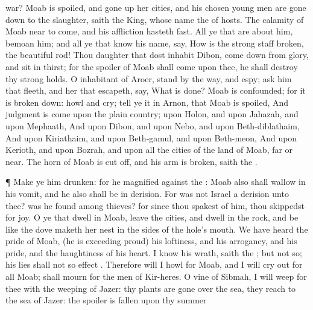{war?
Moab is
spoiled, and gone
up
{} her
cities, and his
chosen young
men are gone
down to the
slaughter,
saith the
King, whose
name
{} the
{} of
hosts.
The
calamity of
Moab
{}
near to
come, and his
affliction
hasteth
fast.
All ye that are
about him,
bemoan him; and all ye that
know his
name,
say, How is the
strong
staff
broken,
{} the
beautiful
rod!
Thou
daughter that dost
inhabit
Dibon, come
down from
{}
glory, and
sit in
thirst; for the
spoiler of
Moab shall
come upon thee,
{} he shall
destroy thy strong
holds.
O
inhabitant of
Aroer,
stand by the
way, and
espy;
ask him that
fleeth, and her that
escapeth,
{}
say, What is
done?
Moab is
confounded; for it is broken
down:
howl and
cry;
tell ye it in
Arnon, that
Moab is
spoiled,
And
judgment is
come upon the
plain
country; upon
Holon, and upon
Jahazah, and upon
Mephaath,
And upon
Dibon, and upon
Nebo, and upon
Beth-diblathaim,
And upon
Kiriathaim, and upon
Beth-gamul, and upon
Beth-meon,
And upon
Kerioth, and upon
Bozrah, and upon all the
cities of the
land of
Moab,
far or
near.
The
horn of
Moab is cut
off, and his
arm is
broken,
saith the
{}.
\par }{\PP {}¶ Make ye him
drunken: for he
magnified
{} against the
{}:
Moab also shall
wallow in his
vomit, and he also shall be in
derision.
For was not
Israel a
derision unto thee? was he
found among
thieves? for
since thou
spakest of him, thou
skippedst for joy.
O ye that
dwell in
Moab,
leave the
cities, and
dwell in the
rock, and be like the
dove
{} maketh her
nest in the
sides of the
hole’s
mouth.
We have
heard the
pride of
Moab, (he is
exceeding
proud) his
loftiness, and his
arrogancy, and his
pride, and the
haughtiness of his
heart.
I
know his
wrath,
saith the
{}; but
{} not
{} so; his
lies shall not so
effect
{}.
Therefore will I
howl for
Moab, and I will cry
out for all
Moab;
{} shall
mourn for the
men of
Kir-heres.
O
vine of
Sibmah, I will
weep for thee with the
weeping of
Jazer: thy
plants are gone
over the
sea, they
reach
{} to the
sea of
Jazer: the
spoiler is
fallen upon thy summer
}
